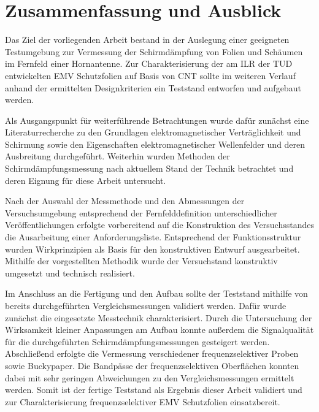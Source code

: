 

\chapter{Zusammenfassung und Ausblick}\label{cha:5}

Das Ziel der vorliegenden Arbeit bestand in der Auslegung einer geeigneten Testumgebung zur Vermessung der Schirmdämpfung von Folien und Schäumen im Fernfeld einer Hornantenne. Zur Charakterisierung der am ILR der TUD entwickelten EMV Schutzfolien auf Basis von CNT sollte im weiteren Verlauf anhand der ermittelten Designkriterien ein Teststand entworfen und aufgebaut werden.
\par
\vspace{\linespace}
Als Ausgangspunkt für weiterführende Betrachtungen wurde dafür zunächst eine Literaturrecherche zu den Grundlagen elektromagnetischer Verträglichkeit und Schirmung sowie den Eigenschaften elektromagnetischer Wellenfelder und deren Ausbreitung durchgeführt. Weiterhin wurden Methoden der Schirmdämpfungsmessung nach aktuellem Stand der Technik betrachtet und deren Eignung für diese Arbeit untersucht.
\par
\vspace{\linespace}
Nach der Auswahl der Messmethode und den Abmessungen der Versuchsumgebung entsprechend der Fernfelddefinition unterschiedlicher Veröffentlichungen erfolgte vorbereitend auf die Konstruktion des Versuchsstandes die Ausarbeitung einer Anforderungsliste. Entsprechend der Funktionsstruktur wurden Wirkprinzipien als Basis für den konstruktiven Entwurf ausgearbeitet. Mithilfe der vorgestellten Methodik wurde der Versuchstand konstruktiv umgesetzt und technisch realisiert.
\par
\vspace{\linespace}
Im Anschluss an die Fertigung und den Aufbau sollte der Teststand mithilfe von bereits durchgeführten Vergleichsmessungen validiert werden. Dafür wurde zunächst die eingesetzte Messtechnik charakterisiert. Durch die Untersuchung der Wirksamkeit kleiner Anpassungen am Aufbau konnte außerdem die Signalqualität für die durchgeführten Schirmdämpfungsmessungen gesteigert werden. Abschließend erfolgte die Vermessung verschiedener frequenzselektiver Proben sowie Buckypaper. Die Bandpässe der frequenzselektiven Oberflächen konnten dabei mit sehr geringen Abweichungen zu den Vergleichsmessungen ermittelt werden. Somit ist der fertige Teststand als Ergebnis dieser Arbeit validiert und zur Charakterisierung frequenzselektiver EMV Schutzfolien einsatzbereit.

